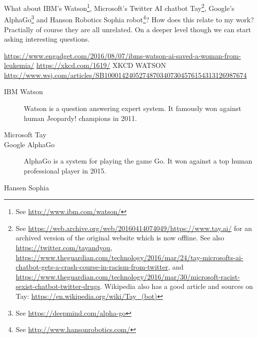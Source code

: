 \documentclass[11pt]{thesis} %
\begin{document}


What about IBM's Watson\footnote{See \url{http://www.ibm.com/watson/}}, Microsoft's Twitter \ac{AI} chatbot Tay\footnote{See \url{https://web.archive.org/web/20160414074049/https://www.tay.ai/} for an archived version of the original website which is now offline. See also \url{https://twitter.com/tayandyou}, \url{https://www.theguardian.com/technology/2016/mar/24/tay-microsofts-ai-chatbot-gets-a-crash-course-in-racism-from-twitter}, and \url{https://www.theguardian.com/technology/2016/mar/30/microsoft-racist-sexist-chatbot-twitter-drugs}. Wikipedia also has a good article and sources on Tay: \url{https://en.wikipedia.org/wiki/Tay_(bot)}}, Google's AlphaGo\footnote{See \url{https://deepmind.com/alpha-go}} and Hanson Robotics Sophia robot\footnote{See \url{http://www.hansonrobotics.com/}}? How does this relate to my work? Practially of course they are all unrelated. On a deeper level though we can start asking interesting questions. 

\url{https://www.engadget.com/2016/08/07/ibms-watson-ai-saved-a-woman-from-leukemia/}
\url{https://xkcd.com/1619/} XKCD WATSON
\url{http://www.wsj.com/articles/SB10001424052748703407304576154313126987674}

\begin{description}
  \item[IBM Watson] Watson is a question answering expert system. It famously won against human Jeopardy! champions in 2011.
  \item[Microsoft Tay] 
  \item[Google AlphaGo] AlphaGo is a system for playing the game Go. It won against a top human professional player in 2015.
  \item[Hansen Sophia]
\end{description}
\end{document}
